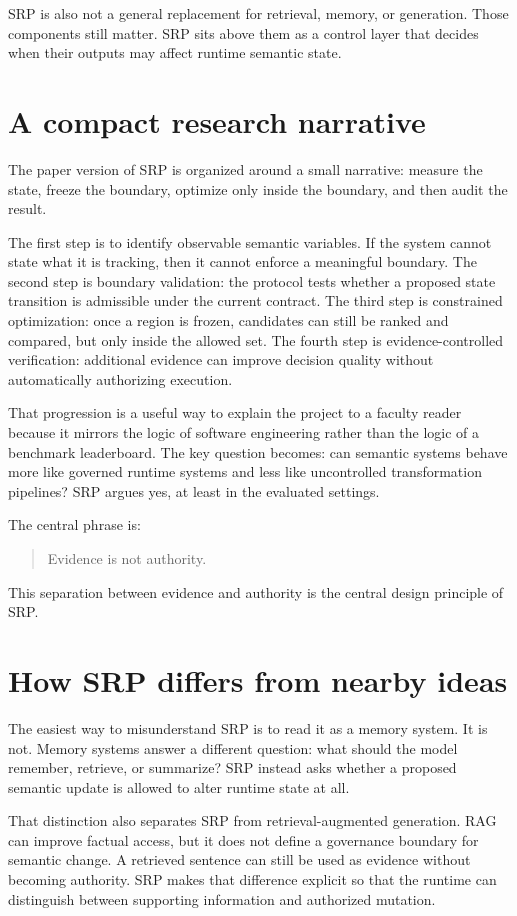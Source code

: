 \documentclass[10pt]{article}
\begin{document}
SRP is also not a general replacement for retrieval, memory, or generation. Those components still matter. SRP sits above them as a control layer that decides when their outputs may affect runtime semantic state.

\section{A compact research narrative}
The paper version of SRP is organized around a small narrative: measure the state, freeze the boundary, optimize only inside the boundary, and then audit the result.

The first step is to identify observable semantic variables. If the system cannot state what it is tracking, then it cannot enforce a meaningful boundary. The second step is boundary validation: the protocol tests whether a proposed state transition is admissible under the current contract. The third step is constrained optimization: once a region is frozen, candidates can still be ranked and compared, but only inside the allowed set. The fourth step is evidence-controlled verification: additional evidence can improve decision quality without automatically authorizing execution.

That progression is a useful way to explain the project to a faculty reader because it mirrors the logic of software engineering rather than the logic of a benchmark leaderboard. The key question becomes: can semantic systems behave more like governed runtime systems and less like uncontrolled transformation pipelines? SRP argues yes, at least in the evaluated settings.

The central phrase is:

\begin{quote}
Evidence is not authority.
\end{quote}

This separation between evidence and authority is the central design principle of SRP.

\section{How SRP differs from nearby ideas}
The easiest way to misunderstand SRP is to read it as a memory system. It is not. Memory systems answer a different question: what should the model remember, retrieve, or summarize? SRP instead asks whether a proposed semantic update is allowed to alter runtime state at all.

That distinction also separates SRP from retrieval-augmented generation. RAG can improve factual access, but it does not define a governance boundary for semantic change. A retrieved sentence can still be used as evidence without becoming authority. SRP makes that difference explicit so that the runtime can distinguish between supporting information and authorized mutation.
\end{document}

